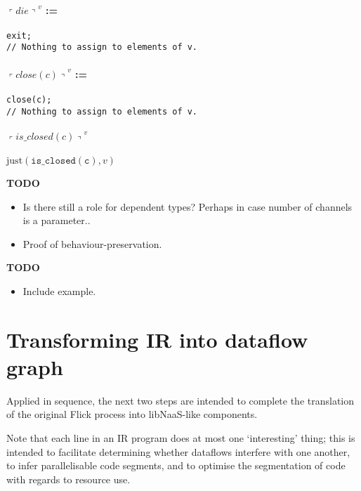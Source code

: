 \documentclass{article}
\newenvironment{todo}{\begin{mdframed}[backgroundcolor=gray!20]\bf TODO \begin{itemize}}{\end{itemize}\end{mdframed}}
\newcommand{\q}[1]{\ensuremath{\left\ulcorner #1\right\urcorner}}
\begin{document}
\paragraph{$\q{die}^v$ := }
\hfill\begin{minipage}{\textwidth}
\begin{verbatim}
exit;
// Nothing to assign to elements of v.
\end{verbatim}
\end{minipage}

\paragraph{$\q{close(c)}^v$ := }
\hfill\begin{minipage}{\textwidth}
\begin{verbatim}
close(c);
// Nothing to assign to elements of v.
\end{verbatim}
\end{minipage}

\paragraph{$\q{is\_closed(c)}^v$  } $\mathrm{just}(\mathtt{is\_closed(c)}, v)$

\begin{todo}
\item Is there still a role for dependent types? Perhaps in case number of channels is a parameter..
\item Proof of behaviour-preservation.
\end{todo}

\begin{todo}
\item Include example.
\end{todo}


\section{Transforming IR into dataflow graph}
Applied in sequence, the next two steps are intended to complete the translation
of the original Flick process into libNaaS-like components.

Note that each line in an IR program does at most one `interesting' thing; this
is intended to facilitate determining whether dataflows interfere with one
another, to infer parallelisable code segments, and to optimise the segmentation
of code with regards to resource use.
\end{document}
